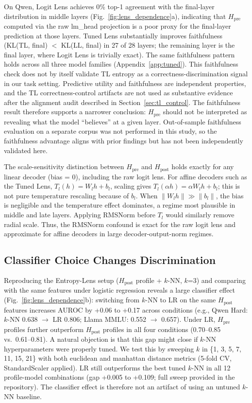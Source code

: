 \documentclass{ieeeaccess}
\newcommand{\Hpre}{H_{\text{pre}}}
\newcommand{\Hpost}{H_{\text{post}}}
\begin{document}
On Qwen, Logit Lens achieves 0\% top-1 agreement with the final-layer distribution in middle layers (Fig.~\ref{fig:lens_dependence}a), indicating that $\Hpre$ computed via the raw lm\_head projection is a poor proxy for the final-layer prediction at those layers. Tuned Lens substantially improves faithfulness (KL(TL, final) $<$ KL(LL, final) in 27 of 28 layers; the remaining layer is the final layer, where Logit Lens is trivially exact). The same faithfulness pattern holds across all three model families (Appendix~\ref{app:tuned}). This faithfulness check does not by itself validate TL entropy as a correctness-discrimination signal in our task setting. Predictive utility and faithfulness are independent properties, and the TL correctness-control artifacts are not used as substantive evidence after the alignment audit described in Section~\ref{sec:tl_control}. The faithfulness result therefore supports a narrower conclusion: $\Hpre$ should not be interpreted as revealing what the model ``believes'' at a given layer. Out-of-sample faithfulness evaluation on a separate corpus was not performed in this study, so the faithfulness advantage aligns with prior findings but has not been independently validated here.

The scale-sensitivity distinction between $\Hpre$ and $\Hpost$ holds exactly for any linear decoder (bias = 0), including the raw logit lens. For affine decoders such as the Tuned Lens, $T_l(h)=W_lh+b_l$, scaling gives $T_l(\alpha h)=\alpha W_lh+b_l$; this is not pure temperature rescaling because of $b_l$. When $\|W_l h\| \gg \|b_l\|$, the bias is negligible and the temperature effect dominates, a regime most plausible in middle and late layers. Applying RMSNorm before $T_l$ would similarly remove radial scale. Thus, the RMSNorm confound is exact for the raw logit lens and approximate for affine decoders in large decoder-output-norm regimes.

\subsection{Classifier Choice Changes Discrimination}
\label{sec:classifier}

Reproducing the Entropy-Lens setup ($\Hpost$ profile + $k$-NN, $k$=3) and comparing with the same features under logistic regression reveals a large classifier effect (Fig.~\ref{fig:lens_dependence}b): switching from $k$-NN to LR on the same $\Hpost$ features increases AUROC by +0.06 to +0.17 across conditions (e.g., Qwen Hard: $k$-NN 0.638 $\to$ LR 0.806; Llama MMLU: 0.552 $\to$ 0.657). Under LR, $\Hpre$ profiles further outperform $\Hpost$ profiles in all four conditions (0.70--0.85 vs.\ 0.61--0.81). A natural objection is that this gap might close if $k$-NN hyperparameters were properly tuned. We test this by sweeping $k$ in \{1, 3, 5, 7, 11, 15, 21\} with both euclidean and manhattan distance metrics (5-fold CV, StandardScaler applied). LR still outperforms the best tuned $k$-NN in all 12 profile-model combinations (gap +0.005 to +0.109; full sweep provided in the repository). The classifier effect is therefore not an artifact of using an untuned $k$-NN baseline.
\end{document}
